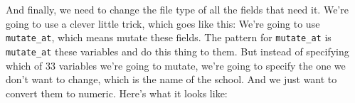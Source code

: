 \documentclass[]{book}
\newenvironment{Shaded}{\begin{snugshade}}{\end{snugshade}}
\newcommand{\KeywordTok}[1]{\textcolor[rgb]{0.13,0.29,0.53}{\textbf{#1}}}
\newcommand{\NormalTok}[1]{#1}
\newcommand{\OperatorTok}[1]{\textcolor[rgb]{0.81,0.36,0.00}{\textbf{#1}}}
\newcommand{\StringTok}[1]{\textcolor[rgb]{0.31,0.60,0.02}{#1}}
\begin{document}
And finally, we need to change the file type of all the fields that need it. We're going to use a clever little trick, which goes like this: We're going to use \texttt{mutate\_at}, which means mutate these fields. The pattern for \texttt{mutate\_at} is \texttt{mutate\_at} these variables and do this thing to them. But instead of specifying which of 33 variables we're going to mutate, we're going to specify the one we don't want to change, which is the name of the school. And we just want to convert them to numeric. Here's what it looks like:

\begin{Shaded}
\end{Shaded}
\end{document}
